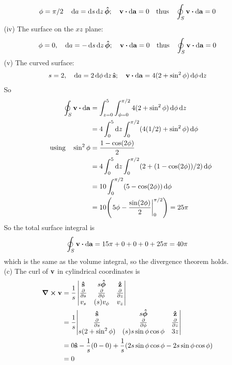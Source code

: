 \documentclass[../main.tex]{subfiles}
\begin{document}
\begin{align*}
    \phi = \pi/2 \quad \dd{a} = \dd{s}\dd{z} \vu*{\phi}; \quad
    \vb{v} \vdot \dd{\vb{a}} = 0
    \qq{thus} \oint_S \vb{v} \vdot \dd{\vb{a}} = 0
\end{align*}
(iv) The surface on the $xz$ plane:
\begin{align*}
    \phi = 0, \quad \dd{a} = - \dd{s}\dd{z} \vu*{\phi}; \quad \vb{v} \vdot \dd{\vb{a}} = 0
    \qq{thus} \oint_S \vb{v} \vdot \dd{\vb{a}} = 0
\end{align*}
(v) The curved surface:
\begin{align*}
    s = 2, \quad \dd{a} = 2 \dd{\phi}\dd{z} \vu{s}; \quad
    \vb{v} \vdot \dd{\vb{a}} = 4(2 + \sin^2\phi) \dd{\phi}\dd{z}
\end{align*}
So
\begin{align*}
    \oint_S \vb{v} \vdot \dd{\vb{a}} &= \int_{z=0}^5 \int_{\phi=0}^{\pi/2} 
        4(2 + \sin^2\phi) \dd{\phi}\dd{z} \\
    &= 4 \int_0^5 \dd{z} \int_0^{\pi/2} (4(1/2) + \sin^2\phi) \dd{\phi} \\
    \qusing \sin^2\phi &= \frac{1 - \cos(2\phi)}{2} \\
    &= 4 \int_0^5 \dd{z} \int_0^{\pi/2} (2 + (1 - \cos(2\phi))/2) \dd{\phi} \\
    &= 10 \int_0^{\pi/2} (5 - \cos(2\phi)) \dd{\phi} \\
    &= 10 \qt(\eval{5\phi - \frac{\sin(2\phi)}{2}}_0^{\pi/2}) = 25\pi
\end{align*}
So the total surface integral is
\begin{align*}
    \oint_S \vb{v} \vdot \dd{\vb{a}} = 15\pi + 0 + 0 + 0 + 25\pi = 40\pi
\end{align*}
which is the same as the volume integral, so the divergence theorem holds. \\
(c) The curl of $\vb{v}$ in cylindrical coordinates is
\begin{align*}
    \curl{\vb{v}} &= \frac{1}{s} \begin{vmatrix}
        \vu{s}  & s \vu*{\phi} & \vu{z}  \\
        \pdv{s} & \pdv{\phi}   & \pdv{z} \\
        v_s     & (s)v_\phi    & v_z
    \end{vmatrix} \\
    &= \frac{1}{s} \mqty|
        \vu{s}            & s \vu*{\phi}           & \vu{z} \\
        \pdv{s}           & \pdv{\phi}             & \pdv{z} \\
        s(2 + \sin^2\phi) & (s)s \sin\phi \cos\phi & 3z| \\
    &= 0 \vu{s} - \frac{1}{s} (0 - 0) + \frac{1}{s} (2s\sin\phi \cos\phi - 2s \sin\phi \cos\phi) \\
    &= 0
\end{align*}
\end{document}
